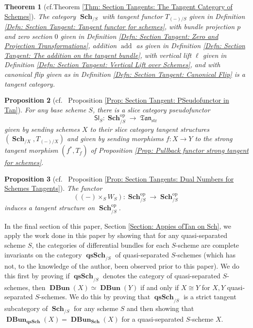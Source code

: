 \documentclass{amsart}
\newtheorem{thmx}{Theorem}
\newtheorem{propx}[thmx]{Proposition}
\theoremstyle{definition}
\DeclareMathOperator{\qsSch}{\mathbf{qsSch}}
\DeclareMathOperator{\fTan}{\mathfrak{Tan}}
\DeclareMathOperator{\op}{op}
\DeclareMathOperator{\Sch}{\mathbf{Sch}}
\DeclareMathOperator{\DBun}{\mathbf{DBun}}
\numberwithin{equation}{subsection}
\begin{document}
\begin{thmx}[{cf.\@ Theorem \ref{Thm: Section Tangents: The Tangent Category of Schemes}}]
The category $\Sch_{/S}$ with tangent functor $T_{(-)/S}$ given in Definition \ref{Defn: Section Tangent: Tangent functor for schemes}, with bundle projection $p$ and zero section $0$ given in Definition \ref{Defn: Section Tangent: Zero and Projection Transformations}, addition $\operatorname{add}$ as given in Definition \ref{Defn: Section Tangent: The addition on the tangent bundle}, with vertical lift $\ell$ given in Definition \ref{Defn: Section Tangent: Vertical Lift over Schemes}, and with canonical flip given as in Definition \ref{Defn: Section Tangent: Canonical Flip} is a tangent category.
\end{thmx}
\begin{propx}[{cf.~ Proposition \ref{Prop: Section Tangent: PSeudofunctor in Tan}}]
For any base scheme $S$, there is a slice category pseudofunctor
\[
\mathsf{Sl}_{S}:\Sch_{/S}^{\op} \to \fTan_{\operatorname{str}}
\]
given by sending schemes $X$ to their slice category tangent structures $(\Sch_{/X}, T_{(-)/X})$ and given by sending morphisms $f:X \to Y$ to the strong tangent morphism $(f^{\ast},T_f)$ of Proposition \ref{Prop: Pullback functor strong tangent for schemes}.
\end{propx}
\begin{propx}[{cf.~ Proposition \ref{Prop: Section Tangents: Dual Numbers for Schemes Tangents}}]
The functor
\[
\left((-) \times_S W_S\right):\Sch_{/S}^{\op} \to \Sch_{/S}^{\op}
\]
induces a tangent structure on $\Sch_{/S}^{\op}$.
\end{propx}


In the final section of this paper, Section \ref{Section: Appies ofTan on Sch}, we apply the work done in this paper by showing that for any quasi-separated scheme $S$, the categories of differential bundles for each $S$-scheme are complete invariants on the category $\qsSch_{/S}$ of quasi-separated $S$-schemes (which has not, to the knowledge of the author, been observed prior to this paper). We do this first by proving if $\qsSch_{/S}$ denotes  the category of quasi-separated $S$-schemes, then $\DBun(X) \simeq \DBun(Y)$ if and only if $X \cong Y$ for $X, Y$ quasi-separated $S$-schemes. We do this by proving that $\qsSch_{/S}$ is a strict tangent subcategory of $\Sch_{/S}$ for any scheme $S$ and then showing that $\DBun_{\qsSch}(X) = \DBun_{\Sch}(X)$ for a quasi-separated $S$-scheme $X$. 
\end{document}
